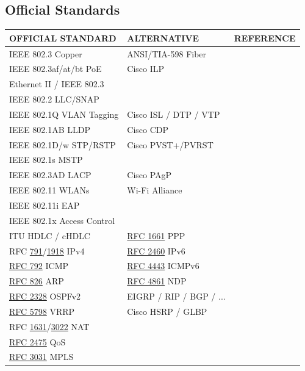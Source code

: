 \documentclass[12pt]{article}
\newcommand{\rfc}[1]{\href{https://datatracker.ietf.org/doc/html/rfc#1}{#1}}
\newcommand{\RFC}[1]{\href{https://datatracker.ietf.org/doc/html/rfc#1}{RFC #1}}
\begin{document}
	\subsection{Official Standards \label{subsec:STANDARDS}}
	\begin{table}[H]
	\centering
	\begin{tabular}{llr}
	\textbf{OFFICIAL STANDARD}		& \textbf{ALTERNATIVE}		& \textbf{REFERENCE}\\\hline
	IEEE 802.3 Copper				& ANSI/TIA-598 Fiber		& \Cref{subsec:CABLING}\\
	IEEE 802.3af/at/bt PoE			& Cisco ILP				& \Cref{tab:POE}\\\hline
	Ethernet II / IEEE 802.3			&					& \Cref{subsec:802.3 ETHERNET}\\
	IEEE 802.2 LLC/SNAP			&					& \Cref{tab:802.2 LLC,tab:802.2 SNAP}\\
	IEEE 802.1Q VLAN Tagging		& Cisco ISL / DTP / VTP		& \Cref{subsec:VLAN TAGGING,subsec:CISCO VTP}\\
	IEEE 802.1AB LLDP			& Cisco CDP			& \Cref{subsec:CDP/802.1AB}\\
	IEEE 802.1D/w STP/RSTP			& Cisco PVST+/PVRST		& \Cref{subsec:802.1D/w}\\
	IEEE 802.1s MSTP				&					&\\
	IEEE 802.3AD LACP			& Cisco PAgP			&\\
	IEEE 802.11 WLANs			& Wi-Fi Alliance			& \Cref{subsec:802.11 WLANS}\\
	IEEE 802.11i EAP				&					& \Cref{fig:WIRELESS SECURITY}\\
	IEEE 802.1x Access Control		&					& \Cref{fig:WIRELESS SECURITY}\\
	ITU HDLC / cHDLC			& \RFC{1661} PPP			& \Cref{subsec:ITU HDLC,subsec:IETF PPP}\\\hline
	RFC \rfc{791}/\rfc{1918} IPv4		& \RFC{2460} IPv6		& \Cref{subsec:IPV4,subsec:IPV6}\\
	\RFC{792} ICMP				& \RFC{4443} ICMPv6		& \Cref{subsec:ICMP}\\
	\RFC{826} ARP				& \RFC{4861} NDP		& \Cref{subsec:ARP,subsec:NDP}\\
	\RFC{2328} OSPFv2			& EIGRP / RIP / BGP / ...		& \Cref{subsec:OSPF}\\
	\RFC{5798} VRRP				& Cisco HSRP / GLBP		&\\
	RFC \rfc{1631}/\rfc{3022} NAT		&					&\\
	\RFC{2475} QoS				&					& \Cref{sec:QOS}\\
	\RFC{3031} MPLS				&					& \Cref{sec:MPLS}\\\hline

\end{tabular}
\end{table}
\end{document}
